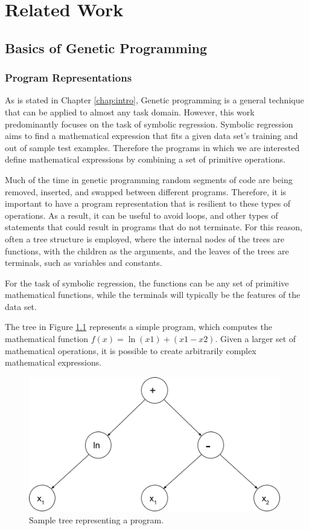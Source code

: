 \chapter{Related Work}
\label{chap:relatedwork}
\section{Basics of Genetic Programming}
\subsection{Program Representations}
As is stated in Chapter \ref{chap:intro}, Genetic programming is a general technique that can be applied to almost any task domain.  However, this work predominantly focuses on the task of symbolic regression.  Symbolic regression aims to find a mathematical expression that fits a given data set's training and out of sample test examples.  Therefore the programs in which we are interested define mathematical expressions by combining a set of primitive operations.

Much of the time in genetic programming random segments of code are being removed, inserted, and swapped between different programs.  Therefore, it is important to have a program representation that is resilient to these types of operations.  As a result, it can be useful to avoid loops, and other types of statements that could result in programs that do not terminate.  For this reason, often a tree structure is employed, where the internal nodes of the trees are functions, with the children as the arguments, and the leaves of the trees are terminals, such as variables and constants.

For the task of symbolic regression, the functions can be any set of primitive mathematical functions, while the terminals will typically be the features of the data set.

The tree in Figure \ref{figure:gp_tree} represents a simple program, which computes the mathematical function $f(x) = \ln(x1) + (x1 - x2)$.  Given a larger set of mathematical operations, it is possible to create arbitrarily complex mathematical expressions.

\noindent
\begin{figure}[h]
\centering
\includegraphics[width=110mm]{gp_tree_colorless}
\caption{Sample tree representing a program.}
\label{figure:gp_tree}
\end{figure}

